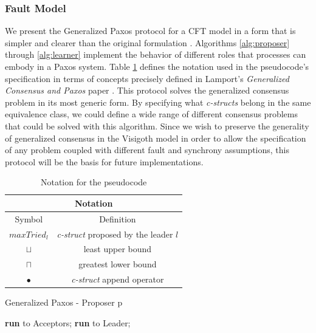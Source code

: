 \documentclass[runningheads,a4paper]{llncs}
\begin{document}
\subsubsection{Fault Model}
We present the Generalized Paxos protocol for a CFT model in a form that is simpler and clearer than the original formulation \cite{Lamport2005}. Algorithms \ref{alg:proposer} through \ref{alg:learner} implement the behavior of different roles that processes can embody in a Paxos system. Table \ref{table:1} defines the notation used in the pseudocode's specification in terms of concepts precisely defined in Lamport's \textit{Generalized Consensus and Paxos} paper \cite{Lamport2005}. This protocol solves the generalized consensus problem in its most generic form. By specifying what \textit{c-structs} belong in the same equivalence class, we could define a wide range of different consensus problems that could be solved with this algorithm. Since we wish to preserve the generality of generalized consensus in the Visigoth model in order to allow the specification of any problem coupled with different fault and synchrony assumptions, this protocol will be the basis for future implementations. 

\begin{table}[h!]
	\renewcommand{\arraystretch}{1.5}
	\centering
	\begin{tabular}{ |c|c|}
		\hline
		\multicolumn{2}{|c|}{Notation}\\
		\hline
		Symbol & Definition \\
		\hline
		$maxTried_l$  & \textit{c-struct} proposed by the leader $l$ \\
		\hline
		$\sqcup$ & least upper bound \\
		\hline
		$\sqcap$ & greatest lower bound \\
		\hline
		$\bullet$ & \textit{c-struct} append operator \\
		\hline
	\end{tabular} 
	\caption{Notation for the pseudocode} 
	\label{table:1}
\end{table}

\begin{algorithm}
	\caption{Generalized Paxos - Proposer p}
	\label{alg:proposer}
	\begin{algorithmic}[1]
		
		\State \textbf{run}  to Acceptors;
		\Else
		\State \textbf{run}  to Leader;
		\EndIf
		\EndFunction
		
		
	\end{algorithmic}
\end{algorithm}
\end{document}
